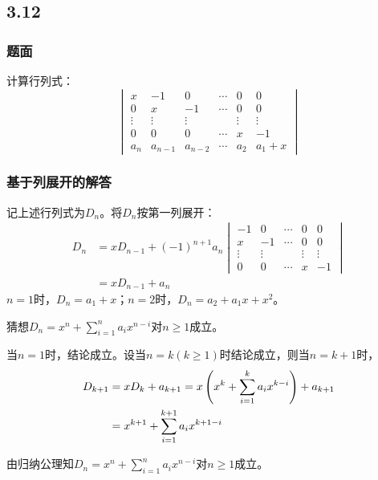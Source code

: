 \documentclass[10pt,xcolor=svgnames]{beamer} %
\begin{document}
\subsection*{3.12}
\begin{frame}
    \frametitle{题面}
    计算行列式：
    \begin{equation*}
        \begin{vmatrix}
            x      & -1      & 0       & \cdots & 0      & 0      \\
            0      & x       & -1      & \cdots & 0      & 0      \\
            \vdots & \vdots  & \vdots  &        & \vdots & \vdots \\
            0      & 0       & 0       & \cdots & x      & -1     \\
            a_n    & a_{n-1} & a_{n-2} & \cdots & a_2    & a_1+x
        \end{vmatrix}
    \end{equation*}
\end{frame}
\begin{frame}[allowframebreaks]
    \frametitle{基于列展开的解答}

    记上述行列式为\(D_n\)。将\(D_n\)按第一列展开：
    \begin{align*}
        D_n & =xD_{n-1}+(-1)^{n+1}a_n
        \begin{vmatrix}
            -1     & 0      & \cdots & 0      & 0      \\
            x      & -1     & \cdots & 0      & 0      \\
            \vdots & \vdots &        & \vdots & \vdots \\
            0      & 0      & \cdots & x      & -1
        \end{vmatrix} \\
            & =xD_{n-1}+a_n
    \end{align*}
    \(n=1\)时，\(D_n=a_1+x\)；\(n=2\)时，\(D_n=a_2+a_1x+x^2\)。

    猜想\(D_n=x^n+\sum_{i=1}^{n}a_ix^{n-i}\)对\(n\geq1\)成立。

    当\(n=1\)时，结论成立。设当\(n=k\)\((k\geq1)\)时结论成立，则当\(n=k+1\)时，
    \begin{align*}
        D_{k+1} & =xD_k+a_{k+1}=x\left( x^k+\sum_{i=1}^{k}a_ix^{k-i} \right)+a_{k+1} \\
                & =x^{k+1}+\sum_{i=1}^{k+1}a_ix^{k+1-i}
    \end{align*}

    由归纳公理知\(D_n=x^n+\sum_{i=1}^{n}a_ix^{n-i}\)对\(n\geq1\)成立。

\end{frame}
\end{document}
